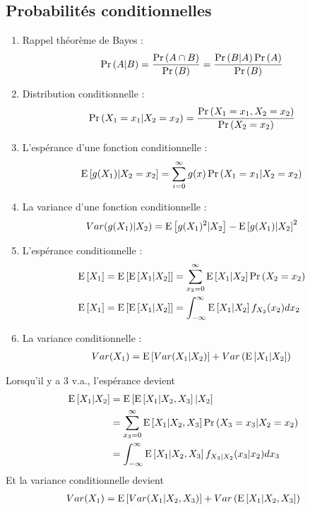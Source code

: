 \documentclass[10pt, french, landscape]{article}
\begin{document}
\small
\begin{multicols*}{3} %
\section{Probabilités conditionnelles}
\begin{enumerate}[label=\faAngleRight]
\item Rappel théorème de Bayes : 
\begin{align*}
\Pr \left( A | B \right) = \frac{\Pr \left( A \cap B \right)}{\Pr \left( B \right)} = \frac{\Pr \left( B|A \right) \Pr \left( A \right)}{\Pr \left( B \right)}
\end{align*}

\item Distribution conditionnelle : 
\begin{align*}
\Pr \left( X_1 = x_1 | X_2 = x_2 \right) & = \frac{\Pr \left( X_1 = x_1, X_2 = x_2 \right)}{\Pr \left( X_2 = x_2 \right)} \\
\end{align*}

\item L'espérance d'une fonction conditionnelle : 
\begin{align*}
\mathrm{E} \left[ g(X_1) | X_2 = x_2 \right] = \sum_{i=0}^{\infty} g(x) \Pr \left( X_1 = x_1 | X_2 = x_2 \right)
\end{align*}

\item La variance d'une fonction conditionnelle :
\begin{align*}
Var(g(X_1) | X_2) = \mathrm{E} \left[ g(X_1)^2 |X_2 \right] - \mathrm{E} \left[ g(X_1) | X_2 \right]^2
\end{align*}

\item L'espérance conditionnelle : 
\begin{align*}
\mathrm{E} \left[ X_1 \right] 	& = \mathrm{E} \left[ \mathrm{E} \left[ X_1 | X_2 \right] \right] = \sum_{x_2 = 0}^{\infty} \mathrm{E} \left[ X_1 | X_2 \right] \Pr \left( X_2 = x_2 \right) \\
\mathrm{E} \left[ X_1 \right]	& = \mathrm{E} \left[ \mathrm{E} \left[ X_1 | X_2 \right] \right] = \int_{-\infty}^{\infty} \mathrm{E} \left[ X_1 | X_2 \right] f_{X_2}(x_2) d x_2 \\
\end{align*}

\item La variance conditionnelle : 
\begin{align*}
Var(X_1) = \mathrm{E} \left[ Var(X_1 | X_2) \right] + Var\left( \mathrm{E} \left[ X_1 | X_2 \right] \right)
\end{align*}
\end{enumerate}

Lorsqu'il y a 3 v.a., l'espérance devient
\begin{align*}
\mathrm{E} \left[ X_1 | X_2 \right]	& = \mathrm{E} \left[ \mathrm{E} \left[ X_1 | X_2, X_3 \right] | X_2 \right] \\
	& = \sum_{x_3 = 0}^{\infty} \mathrm{E} \left[ X_1 | X_2, X_3 \right] \Pr \left( X_3 = x_3 | X_2 = x_2 \right) \\
	& = \int_{-\infty}^{\infty} \mathrm{E} \left[ X_1 | X_2, X_3 \right] f_{X_3| X_2}(x_3 | x_2) dx_3
\end{align*}
Et la variance conditionnelle devient
\begin{align*}
Var(X_1) = \mathrm{E} \left[ Var(X_1 | X_2, X_3) \right]  + Var \left( \mathrm{E} \left[ X_1 | X_2, X_3 \right] \right)
\end{align*}


\end{multicols*}
\end{document}

